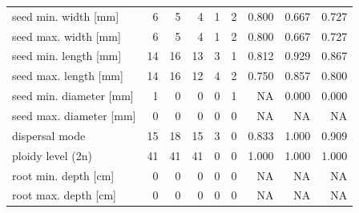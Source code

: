\begin{longtable}{p{}rrrrrrrr}
seed min. width [mm] & 6 & 5 & 4 & 1 & 2 & 0.800 & 0.667 & 0.727 \\
seed max. width [mm] & 6 & 5 & 4 & 1 & 2 & 0.800 & 0.667 & 0.727 \\
seed min. length [mm] & 14 & 16 & 13 & 3 & 1 & 0.812 & 0.929 & 0.867 \\
seed max. length [mm] & 14 & 16 & 12 & 4 & 2 & 0.750 & 0.857 & 0.800 \\
seed min. diameter [mm] & 1 & 0 & 0 & 0 & 1 & NA & 0.000 & 0.000 \\
seed max. diameter [mm] & 0 & 0 & 0 & 0 & 0 & NA & NA & NA \\
dispersal mode & 15 & 18 & 15 & 3 & 0 & 0.833 & 1.000 & 0.909 \\
ploidy level (2n) & 41 & 41 & 41 & 0 & 0 & 1.000 & 1.000 & 1.000 \\
root min. depth [cm] & 0 & 0 & 0 & 0 & 0 & NA & NA & NA \\
root max. depth [cm] & 0 & 0 & 0 & 0 & 0 & NA & NA & NA \\
\end{longtable}
\endgroup
